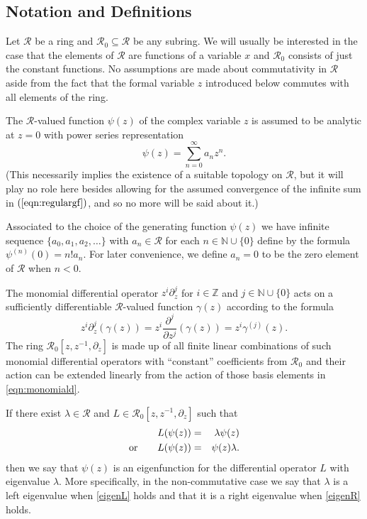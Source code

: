 \documentclass{amsart}
\theoremstyle{definition}
\theoremstyle{remark}
\numberwithin{equation}{section}
\def\R{\mathcal{R}}
\def\Z{\mathbb{Z}}
\def\N{\mathbb{N}}
\begin{document}
\subsection{Notation and Definitions}

Let $\R$ be a ring and $\R_0\subseteq\R$ be any subring. We 
will usually be interested in
the case that the elements of $\R$ are functions of a variable $x$ and
$\R_0$ consists of just the constant functions.
No assumptions are made about commutativity in $\R$ aside from
the fact that the formal variable $z$ introduced below commutes with all elements of
the ring.

The $\R$-valued function $\psi(z)$ 
of the complex variable $z$  is assumed to be analytic at $z=0$ with
power series representation
\begin{equation}
\psi(z)=\sum_{n=0}^{\infty} a_n z^n.\label{eqn:regulargf}
\end{equation}
(This necessarily implies the existence of a suitable topology on
$\R$, but it will play no role here besides allowing for the assumed
convergence of the infinite sum in $(\ref{eqn:regulargf})$, and so no
more will be said about it.)


Associated to the choice of the generating function $\psi(z)$ we have
infinite sequence $\{a_0,a_1,a_2,\ldots\}$ with $a_n\in\R$ for each $n\in\N\cup\{0\}$
define by the formula
 $\psi^{(n)}(0)=n! a_n$.
For later
convenience, we define $a_n=0$ to be the zero element of $\R$
when $n<0$.


The monomial differential operator $z^i \partial_z^j$ for
$i\in\Z$ and $j\in\N\cup\{0\}$ acts on a sufficiently differentiable $\R$-valued function 
$\gamma(z)$ 
according to the formula
\begin{equation}
z^i\partial_z^j(\gamma(z))=z^i\frac{\partial^j}{\partial z^j}(\gamma(z))=z^i\gamma^{(j)}(z).
\label{eqn:monomiald}
\end{equation}
The ring $\R_0[z,z^{-1},\partial_z]$ is made up of all finite linear
combinations of such monomial differential operators with ``constant''
coefficients
from $\R_0$ and their action can be extended linearly from
the action of those basis elements in \eqref{eqn:monomiald}.

If there exist 
$\lambda\in\R$ and $L\in \R_0[z,z^{-1},\partial_z]$ such that
\begin{eqnarray}
\label{eigenL}L(\psi(z))&=&\lambda\psi(z)\\\hbox{or}\qquad
L(\psi(z))&=&\psi(z)\lambda.\label{eigenR}
\end{eqnarray}
then we say that $\psi(z)$ is an eigenfunction for the differential
operator $L$ with eigenvalue $\lambda$.  More specifically, in the
non-commutative case we say that $\lambda$ is a left eigenvalue when
\eqref{eigenL} holds and that it is a right eigenvalue when
\eqref{eigenR} holds.
\end{document}
